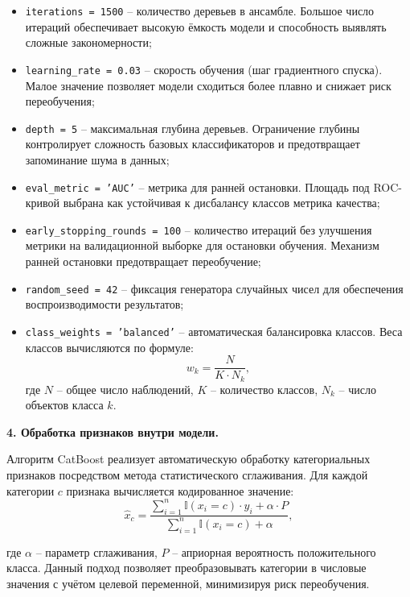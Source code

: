 \begin{itemize}
    \item \texttt{iterations = 1500} – количество деревьев в ансамбле. Большое число итераций обеспечивает высокую ёмкость модели и способность выявлять сложные закономерности;
    \item \texttt{learning\_rate = 0.03} – скорость обучения (шаг градиентного спуска). Малое значение позволяет модели сходиться более плавно и снижает риск переобучения;
    \item \texttt{depth = 5} – максимальная глубина деревьев. Ограничение глубины контролирует сложность базовых классификаторов и предотвращает запоминание шума в данных;
    \item \texttt{eval\_metric = 'AUC'} – метрика для ранней остановки. Площадь под ROC-кривой выбрана как устойчивая к дисбалансу классов метрика качества;
    \item \texttt{early\_stopping\_rounds = 100} – количество итераций без улучшения метрики на валидационной выборке для остановки обучения. Механизм ранней остановки предотвращает переобучение;
    \item \texttt{random\_seed = 42} – фиксация генератора случайных чисел для обеспечения воспроизводимости результатов;
    \item \texttt{class\_weights = 'balanced'} – автоматическая балансировка классов. Веса классов вычисляются по формуле:
    \begin{equation*}
    w_k = \frac{N}{K \cdot N_k},
    \end{equation*}
    где $N$ – общее число наблюдений, $K$ – количество классов, $N_k$ – число объектов класса $k$.
\end{itemize}

\textbf{4. Обработка признаков внутри модели.}

Алгоритм CatBoost реализует автоматическую обработку категориальных признаков посредством метода статистического сглаживания. Для каждой категории $c$ признака вычисляется кодированное значение:
\begin{equation*}
\hat{x}_c = \frac{\sum_{i=1}^{n} \mathbb{I}(x_i = c) \cdot y_i + \alpha \cdot P}{\sum_{i=1}^{n} \mathbb{I}(x_i = c) + \alpha},
\end{equation*}

где $\alpha$ – параметр сглаживания, $P$ – априорная вероятность положительного класса. Данный подход позволяет преобразовывать категории в числовые значения с учётом целевой переменной, минимизируя риск переобучения.

